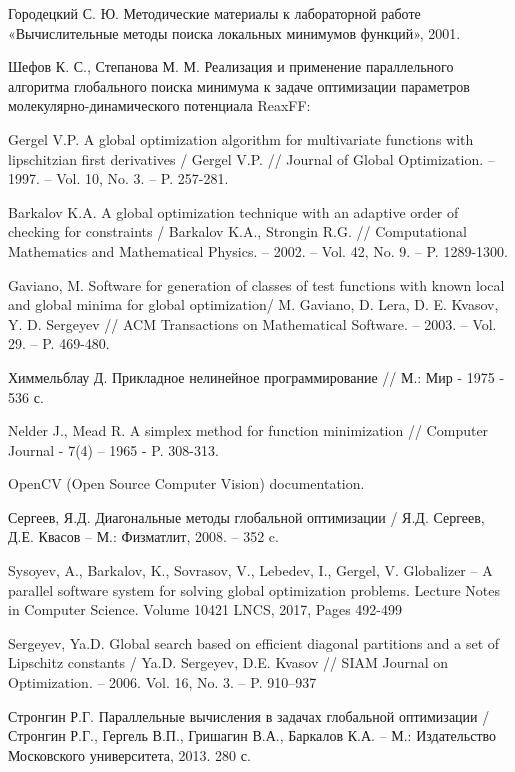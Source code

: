 \documentclass{svproc}
\begin{document}
\begin{thebibliography}{6}
Городецкий С. Ю. Методические материалы к лабораторной работе «Вычислительные методы поиска локальных минимумов функций», 2001.%

Шефов К. С., Степанова М. М. Реализация и применение параллельного алгоритма глобального поиска минимума к задаче оптимизации параметров молекулярно-динамического потенциала ReaxFF: %

Gergel V.P. A global optimization algorithm for multivariate functions with lipschitzian first derivatives / Gergel V.P. // Journal of Global Optimization. – 1997. – Vol. 10, No. 3. – P. 257-281.

Barkalov K.A. A global optimization technique with an adaptive order of checking for constraints / Barkalov K.A., Strongin R.G. // Computational Mathematics and Mathematical Physics. – 2002. – Vol. 42, No. 9. – P. 1289-1300.

Gaviano, M. Software for generation of classes of test functions with known local and global minima for global optimization/ M. Gaviano, D. Lera, D. E. Kvasov, Y. D. Sergeyev // ACM Transactions on Mathematical Software. – 2003. – Vol. 29. – P. 469-480.

Химмельблау Д. Прикладное нелинейное программирование // М.: Мир - 1975 - 536 с. 

Nelder J., Mead R. A simplex method for function minimization // Computer Journal - 7(4) – 1965 - P. 308-313.

OpenCV (Open Source Computer Vision) documentation. %

Сергеев, Я.Д. Диагональные методы глобальной оптимизации / Я.Д. Сергеев, Д.Е. Квасов – М.: Физматлит, 2008. – 352 c.

Sysoyev, A.,  Barkalov, K.,  Sovrasov, V.,  Lebedev, I.,  Gergel, V. Globalizer – A parallel software system for solving global optimization problems. Lecture Notes in Computer Science. Volume 10421 LNCS, 2017, Pages 492-499

Sergeyev, Ya.D. Global search based on efficient diagonal partitions and a set of Lipschitz constants / Ya.D. Sergeyev, D.E. Kvasov // SIAM Journal on Optimization. – 2006. Vol. 16, No. 3. – P. 910–937

Стронгин Р.Г. Параллельные вычисления в задачах глобальной оптимизации / Стронгин Р.Г., Гергель В.П., Гришагин В.А., Баркалов К.А. – М.: Издательство Московского университета, 2013. 280 с.









\end{thebibliography}
\end{document}
